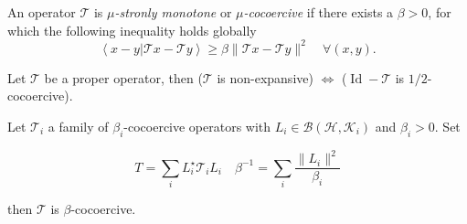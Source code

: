 \documentclass[varwidth=15cm, border=.5cm]{standalone}
\DeclareMathOperator{\id}{Id}
\newcommand{\innerp}[2]{\left\langle #1 \vert #2 \right\rangle}
\begin{document}
\begin{definition}[label=m2qlq7ne, name=Cocoercive Operators]
	An operator \( \mathcal{T} \) is \textit{\( \mu \)-stronly monotone} or \textit{\( \mu \)-cocoercive}  if there exists 
	a \( \beta > 0 \), for which the following inequality holds globally
	\[
		\innerp{x - y}{\mathcal{T}x - \mathcal{T}y} \geq \beta\lVert\mathcal{T}x - \mathcal{T}y\rVert^2 \quad \forall (x, y).
	\]
	\begin{proposition}[label=wk4xp5i4, name=Cocoerciveness of nonexpansive operators]
		Let \( \mathcal{T} \) be a proper operator, then (\( \mathcal{T} \) is non-expansive) 
		\( \iff \) (\( \id - \mathcal{T} \) is \( 1/2\)-cocoercive).
	\end{proposition}

	\begin{proposition}[label=fgebss0l, name=Sum of cocoercive operators
		under transformation]
		Let \( \mathcal{T}_i \) a family of \( \beta_i \)-cocoercive operators with \( L_i \in \mathcal{B}(\mathcal{H}, \mathcal{K}_i) \)
		and \( \beta_i > 0 \). Set

		\[
			T = \sum_i L_i^\star\mathcal{T}_iL_i \quad \beta^{-1} = \sum_i \frac{\lVert L_i\rVert^2}{\beta_i}
		\]

		then \( \mathcal{T} \) is \( \beta \)-cocoercive.
	\end{proposition}

\end{definition}
\end{document}
